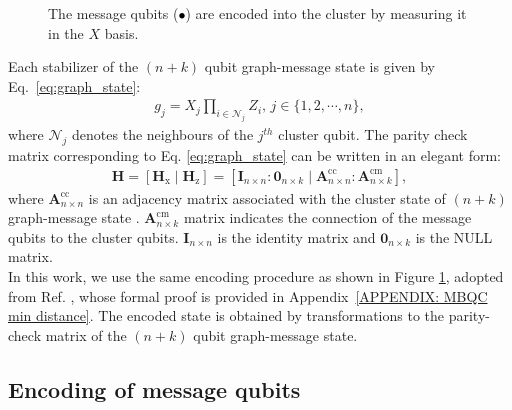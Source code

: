 \documentclass[reprint, amsmath,amssymb, aps,pra,
 floatfix,
]{revtex4-2}
\begin{document}
\begin{figure}[ht]
   \caption{The message qubits (\Large\textcolor{black}{$\bullet$}\normalsize) are encoded into the cluster by measuring it in the $X$ basis.}
   \label{fig: encoding of message using MBQC}
   \end{figure}

\noindent Each stabilizer of the  $(n+k)$ qubit graph-message state is given by  Eq.~\eqref{eq:graph_state}:
\begin{align}
\label{eq:graph_state}
    g_j= X_j \prod_{i \in \mathcal{N}_j} Z_i, \, j \in \{1,2,\cdots, n\},
\end{align}
where $\mathcal{N}_j$ denotes the neighbours of the $j^{th}$ cluster qubit.
The parity check matrix corresponding to Eq. \eqref{eq:graph_state} can be written in an elegant form:
\begin{align}
   \mathbf{H}= [\mathbf{H}_\mathrm{x}\mid\mathbf{H}_\mathrm{z}]=[\mathbf{I}_{n\times n}:\mathbf{0}_{n\times k} \mid \mathbf{A}^{\mathrm{cc}}_{n\times n}:\mathbf{A}^{\mathrm{cm}}_{n\times k}],
  \label{eq:prof ankur equation}
\end{align}
where $\mathbf{A}^{\mathrm{cc}}_{n\times n}$ is an adjacency matrix associated with the cluster state of $(n+k)$ graph-message state \cite{8269075}. 
$\mathbf{A}^{\mathrm{cm}}_{n\times k}$ matrix indicates the connection of the message qubits to the cluster qubits. 
$\mathbf{I}_{n \times n}$ is the identity matrix and $\mathbf{0}_{n\times k}$ is the NULL matrix.\\
\noindent In this work, we use the same encoding procedure as shown in Figure \ref{fig: encoding of message using MBQC}, adopted from Ref. \cite{hwang2015relationgraphcodegraph}, whose formal proof is provided in Appendix~\ref{APPENDIX: MBQC min distance}. 
The encoded state is obtained by transformations to the parity-check matrix of the $(n+k)$ qubit graph-message state.

\subsection{Encoding of message qubits}
\end{document}
